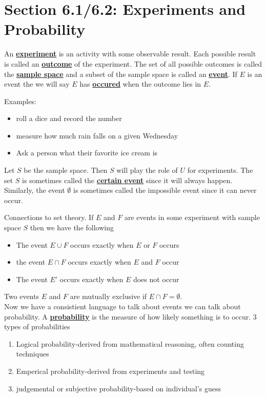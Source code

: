 \documentclass[14,fleqn]{article}
\newcommand{\defn}[1]{\textbf{\underline{#1}}}
\begin{document}
\section{Section 6.1/6.2: Experiments and Probability}
An \defn{experiment} is an activity with some observable result. Each possible result is called an \defn{outcome} of the experiment. The set of all possible outcomes is called the \defn{sample space} and a subset of the sample space is called an \defn{event}. If $E$ is an event the we will say $E$ has \defn{occured} when the outcome lies in $E.$

Examples:\\
\begin{itemize}
	\item roll a dice and record the number
	\item measure how much rain falls on a given Wednesday
	\item Ask a person what their favorite ice cream is
\end{itemize}

Let $S$ be the sample space. Then $S$ will play the role of $U$ for experiments. The set $S$ is sometimes called the \defn{certain event} since it will always happen. Similarly, the event $\emptyset$ is sometimes called the impossible event since it can never occur.

Connections to set theory. If $E$ and $F$ are events in some experiment with sample space $S$ then we have the following
\begin{itemize}
	\item The event $E\cup F$ occurs exactly when $E$ or $F$ occurs
	\item the event $E\cap F$ occurs exactly when $E$ and $F$ occur
	\item The event $E'$ occurs exactly when $E$ does not occur
\end{itemize}
Two events $E$ and $F$ are mutually exclusive if $E\cap F=\emptyset.$\\

Now we have a consistient language to talk about events we can talk about probability. A \defn{probability} is the measure of how likely something is to occur. 3 types of probabilities
\begin{enumerate}
	\item Logical probability-derived from mathematical reasoning, often counting techniques
	\item Emperical probability-derived from experiments and testing
	\item judgemental or subjective probability-based on individual's guess
\end{enumerate}
\end{document}

